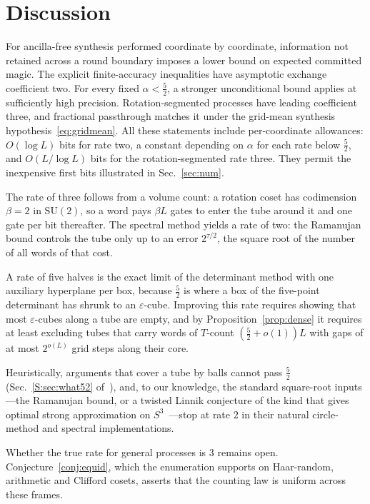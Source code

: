 \documentclass[aps,prx,twocolumn,superscriptaddress,nofootinbib,longbibliography]{revtex4-2}
\theoremstyle{plain}
\theoremstyle{definition}
\theoremstyle{remark}
\newcommand{\SU}{\mathrm{SU}(2)}
\begin{document}
\section{Discussion}\label{sec:disc}

For ancilla-free synthesis performed coordinate by coordinate, information not retained across a round boundary imposes a lower bound on expected committed magic. The explicit finite-accuracy inequalities have asymptotic exchange coefficient two. For every fixed $\alpha<\tfrac52$, a stronger unconditional bound applies at sufficiently high precision. Rotation-segmented processes have leading coefficient three, and fractional passthrough matches it under the grid-mean synthesis hypothesis~\eqref{eq:gridmean}. All these statements include per-coordinate allowances: $O(\log L)$ bits for rate two, a constant depending on $\alpha$ for each rate below $\tfrac52$, and $O(L/\log L)$ bits for the rotation-segmented rate three. They permit the inexpensive first bits illustrated in Sec.~\ref{sec:num}.

The rate of three follows from a volume count: a rotation coset has codimension $\beta=2$ in $\SU$, so a word pays $\beta L$ gates to enter the tube around it and one gate per bit thereafter. The spectral method yields a rate of two: the Ramanujan bound controls the tube only up to an error $2^{\tau/2}$, the square root of the number of all words of that cost. 

A rate of five halves is the exact limit of the determinant method with one auxiliary hyperplane per box, because $\tfrac52$ is where a box of the five-point determinant has shrunk to an $\varepsilon$-cube. Improving this rate requires showing that most $\varepsilon$-cubes along a tube are empty, and by Proposition~\ref{prop:dense} it requires at least excluding tubes that carry words of $T$-count $(\tfrac52+o(1))L$ with gaps of at most $2^{o(L)}$ grid steps along their core. 

Heuristically, arguments that cover a tube by balls cannot pass $\tfrac52$ (Sec.~\ref{S:sec:what52} of~\cite{SM}), and, to our knowledge, the standard square-root inputs---the Ramanujan bound, or a twisted Linnik conjecture of the kind that gives optimal strong approximation on $S^3$~\cite{BKS}---stop at rate $2$ in their natural circle-method and spectral implementations. 

Whether the true rate for general processes is $3$ remains open. Conjecture~\ref{conj:equid}, which the enumeration supports on Haar-random, arithmetic and Clifford cosets, asserts that the counting law is uniform across these frames.
\end{document}
